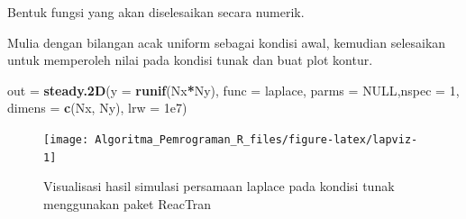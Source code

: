 \documentclass[
]{book}
\newenvironment{Shaded}{\begin{snugshade}}{\end{snugshade}}
\newcommand{\AttributeTok}[1]{\textcolor[rgb]{0.13,0.29,0.53}{#1}}
\newcommand{\ConstantTok}[1]{\textcolor[rgb]{0.56,0.35,0.01}{#1}}
\newcommand{\ControlFlowTok}[1]{\textcolor[rgb]{0.13,0.29,0.53}{\textbf{#1}}}
\newcommand{\DecValTok}[1]{\textcolor[rgb]{0.00,0.00,0.81}{#1}}
\newcommand{\FloatTok}[1]{\textcolor[rgb]{0.00,0.00,0.81}{#1}}
\newcommand{\FunctionTok}[1]{\textcolor[rgb]{0.13,0.29,0.53}{\textbf{#1}}}
\newcommand{\NormalTok}[1]{#1}
\newcommand{\OtherTok}[1]{\textcolor[rgb]{0.56,0.35,0.01}{#1}}
\newcommand{\SpecialCharTok}[1]{\textcolor[rgb]{0.81,0.36,0.00}{\textbf{#1}}}
\theoremstyle{definition}
\theoremstyle{definition}
\theoremstyle{definition}
\theoremstyle{definition}
\theoremstyle{remark}
\begin{document}
Bentuk fungsi yang akan diselesaikan secara numerik.

\begin{Shaded}
\end{Shaded}

Mulia dengan bilangan acak uniform sebagai kondisi awal, kemudian selesaikan untuk memperoleh nilai pada kondisi tunak dan buat plot kontur.

\begin{Shaded}
\begin{Highlighting}[]
\NormalTok{out }\OtherTok{=} \FunctionTok{steady.2D}\NormalTok{(}\AttributeTok{y =} \FunctionTok{runif}\NormalTok{(Nx}\SpecialCharTok{*}\NormalTok{Ny), }\AttributeTok{func =}\NormalTok{ laplace, }
                  \AttributeTok{parms =} \ConstantTok{NULL}\NormalTok{,}\AttributeTok{nspec =} \DecValTok{1}\NormalTok{, }
                  \AttributeTok{dimens =} \FunctionTok{c}\NormalTok{(Nx, Ny), }\AttributeTok{lrw =} \FloatTok{1e7}\NormalTok{)}
\end{Highlighting}
\end{Shaded}

\begin{figure}

{\centering \texttt{[image: Algoritma\_Pemrograman\_R\_files/figure-latex/lapviz-1]} 

}

\caption{Visualisasi hasil simulasi persamaan laplace pada kondisi tunak menggunakan paket ReacTran}\label{fig:lapviz}
\end{figure}
\end{document}
